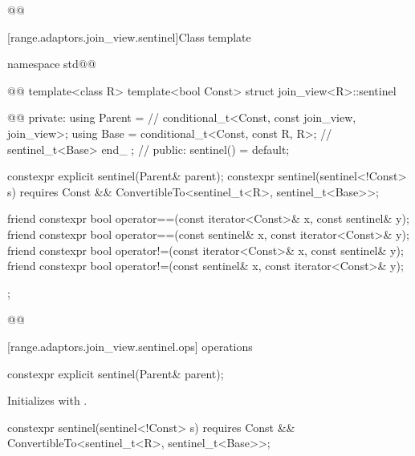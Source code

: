 {\begin{itemdescr}
\pnum
{}
\begin{codeblock}
@@
\end{codeblock}
\end{itemdescr}

[range.adaptors.join_view.sentinel]{Class template }

\pnum
{}

\begin{codeblock}
namespace std@@ { @@
  template<class R>
  template<bool Const>
  struct join_view<R>::sentinel { @\newtxt{// \expos}@
  private:
    using Parent =                                   // \expos
      conditional_t<Const, const join_view, join_view>;
    using Base   = conditional_t<Const, const R, R>; // \expos
    sentinel_t<Base> end_ {};                        // \expos
  public:
    sentinel() = default;

    constexpr explicit sentinel(Parent& parent);
    constexpr sentinel(sentinel<!Const> s) requires Const &&
        ConvertibleTo<sentinel_t<R>, sentinel_t<Base>>;

    friend constexpr bool operator==(const iterator<Const>& x, const sentinel& y);
    friend constexpr bool operator==(const sentinel& x, const iterator<Const>& y);
    friend constexpr bool operator!=(const iterator<Const>& x, const sentinel& y);
    friend constexpr bool operator!=(const sentinel& x, const iterator<Const>& y);
  };
}@\oldtxt{\}}@
\end{codeblock}

[range.adaptors.join_view.sentinel.ops]{ operations}

\begin{itemdecl}
constexpr explicit sentinel(Parent& parent);
\end{itemdecl}

\begin{itemdescr}
\pnum
\effects Initializes  with .
\end{itemdescr}

\begin{itemdecl}
constexpr sentinel(sentinel<!Const> s) requires Const &&
  ConvertibleTo<sentinel_t<R>, sentinel_t<Base>>;
\end{itemdecl}

}
